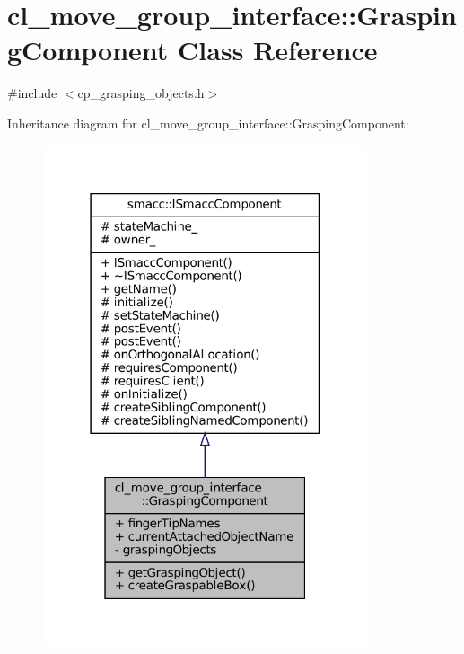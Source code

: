 \hypertarget{classcl__move__group__interface_1_1GraspingComponent}{}\section{cl\+\_\+move\+\_\+group\+\_\+interface\+:\+:Grasping\+Component Class Reference}
\label{classcl__move__group__interface_1_1GraspingComponent}


{\ttfamily \#include $<$cp\+\_\+grasping\+\_\+objects.\+h$>$}



Inheritance diagram for cl\+\_\+move\+\_\+group\+\_\+interface\+:\+:Grasping\+Component\+:
\nopagebreak
\begin{figure}[H]
\begin{center}
\leavevmode
\includegraphics[width=271pt]{classcl__move__group__interface_1_1GraspingComponent__inherit__graph}
\end{center}
\end{figure}


